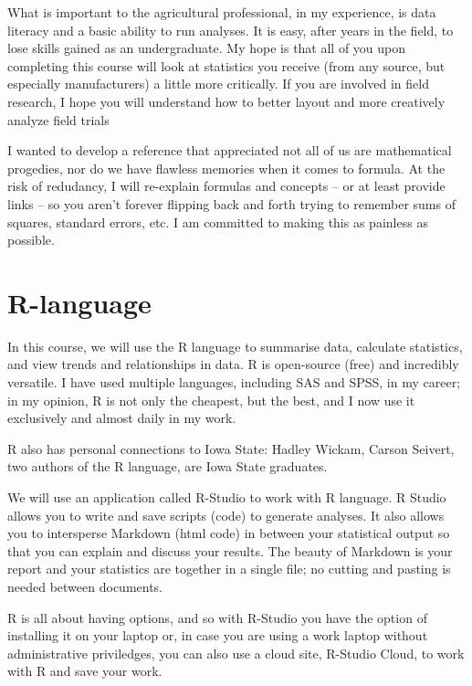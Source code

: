 \documentclass[
]{book}
\begin{document}
What is important to the agricultural professional, in my experience, is data literacy and a basic ability to run analyses. It is easy, after years in the field, to lose skills gained as an undergraduate. My hope is that all of you upon completing this course will look at statistics you receive (from any source, but especially manufacturers) a little more critically. If you are involved in field research, I hope you will understand how to better layout and more creatively analyze field trials

I wanted to develop a reference that appreciated not all of us are mathematical progedies, nor do we have flawless memories when it comes to formula. At the risk of redudancy, I will re-explain formulas and concepts -- or at least provide links -- so you aren't forever flipping back and forth trying to remember sums of squares, standard errors, etc. I am committed to making this as painless as possible.

\hypertarget{r-language}{%
\section*{R-language}\label{r-language}}

In this course, we will use the R language to summarise data, calculate statistics, and view trends and relationships in data. R is open-source (free) and incredibly versatile. I have used multiple languages, including SAS and SPSS, in my career; in my opinion, R is not only the cheapest, but the best, and I now use it exclusively and almost daily in my work.

R also has personal connections to Iowa State: Hadley Wickam, Carson Seivert, two authors of the R language, are Iowa State graduates.

We will use an application called R-Studio to work with R language. R Studio allows you to write and save scripts (code) to generate analyses. It also allows you to intersperse Markdown (html code) in between your statistical output so that you can explain and discuss your results. The beauty of Markdown is your report and your statistics are together in a single file; no cutting and pasting is needed between documents.

R is all about having options, and so with R-Studio you have the option of installing it on your laptop or, in case you are using a work laptop without administrative priviledges, you can also use a cloud site, R-Studio Cloud, to work with R and save your work.
\end{document}
